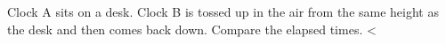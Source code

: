 Clock A sits on a desk. Clock B is tossed up in the air from the same height as the desk and
then comes back down.  Compare the elapsed times.
<%
